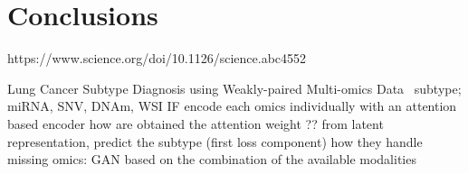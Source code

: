 \documentclass[../main.tex]{subfiles}
\begin{document}
\chapter{Conclusions}
\minitocpage

https://www.science.org/doi/10.1126/science.abc4552

Lung Cancer Subtype Diagnosis using Weakly-paired Multi-omics Data~\cite{Wang2022}
subtype; miRNA, SNV, DNAm, WSI
IF
encode each omics individually with an attention based encoder
how are obtained the attention weight ??
from latent representation, predict the subtype (first loss component)
how they handle missing omics: GAN based on the combination of the available modalities

\end{document}
